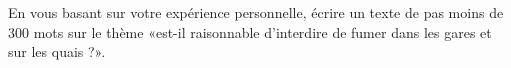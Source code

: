 
\begin{exercice}\label{exosmath-0418}

    En vous basant sur votre expérience personnelle, écrire un texte de pas moins de \( 300\) mots sur le thème «est-il raisonnable d'interdire de fumer dans les gares et sur les quais ?».

\end{exercice}
